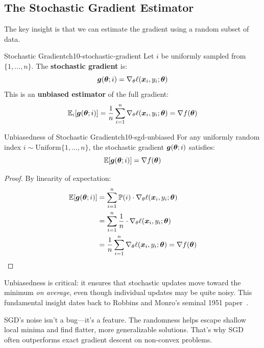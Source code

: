 \documentclass[../../main.tex]{subfiles}
\begin{document}
\subsection{The Stochastic Gradient Estimator}

The key insight is that we can estimate the gradient using a random subset of data.

\begin{definition}{Stochastic Gradient}{ch10-stochastic-gradient}
Let $i$ be uniformly sampled from $\{1, \ldots, n\}$. The \textbf{stochastic gradient} is:
\[
    \boldsymbol{g}(\boldsymbol{\theta}; i) = \nabla_\theta \ell(\boldsymbol{x}_i, y_i; \boldsymbol{\theta})
\]
This is an \textbf{unbiased estimator} of the full gradient:
\[
    \operatorname{\mathbb{E}}_i[\boldsymbol{g}(\boldsymbol{\theta}; i)] = \frac{1}{n} \sum_{i=1}^{n} \nabla_\theta \ell(\boldsymbol{x}_i, y_i; \boldsymbol{\theta}) = \nabla f(\boldsymbol{\theta})
\]
\end{definition}

\begin{theorem}{Unbiasedness of Stochastic Gradient}{ch10-sgd-unbiased}
For any uniformly random index $i \sim \text{Uniform}\{1, \ldots, n\}$, the stochastic gradient $\boldsymbol{g}(\boldsymbol{\theta}; i)$ satisfies:
\[
    \operatorname{\mathbb{E}}[\boldsymbol{g}(\boldsymbol{\theta}; i)] = \nabla f(\boldsymbol{\theta})
\]
\end{theorem}

\begin{proof}
By linearity of expectation:
\begin{align*}
    \operatorname{\mathbb{E}}[\boldsymbol{g}(\boldsymbol{\theta}; i)] &= \sum_{i=1}^{n} \operatorname{\mathbb{P}}(i) \cdot \nabla_\theta \ell(\boldsymbol{x}_i, y_i; \boldsymbol{\theta}) \\
    &= \sum_{i=1}^{n} \frac{1}{n} \cdot \nabla_\theta \ell(\boldsymbol{x}_i, y_i; \boldsymbol{\theta}) \\
    &= \frac{1}{n} \sum_{i=1}^{n} \nabla_\theta \ell(\boldsymbol{x}_i, y_i; \boldsymbol{\theta}) = \nabla f(\boldsymbol{\theta})
\end{align*}
\end{proof}

Unbiasedness is critical: it ensures that stochastic updates move toward the minimum \textit{on average}, even though individual updates may be quite noisy. This fundamental insight dates back to Robbins and Monro's seminal 1951 paper~\cite{robbins1951stochastic}.

\begin{aha}
SGD's noise isn't a bug---it's a feature. The randomness helps escape shallow local minima and find flatter, more generalizable solutions. That's why SGD often outperforms exact gradient descent on non-convex problems.
\end{aha}
\end{document}
